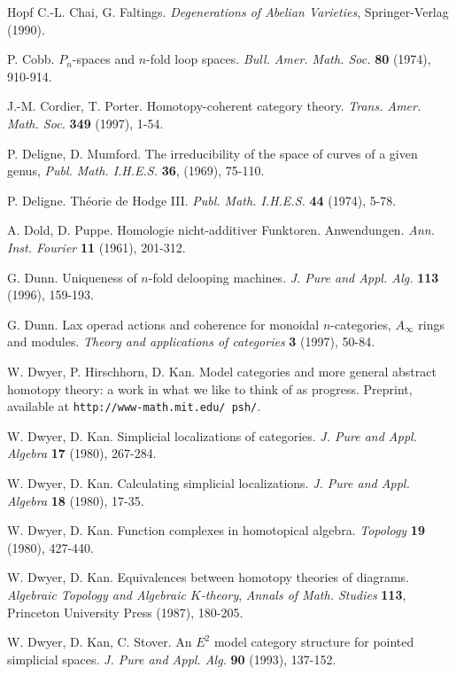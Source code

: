 \begin{thebibliography}{Hopf}
C.-L. Chai, G. Faltings. {\em Degenerations of Abelian Varieties},
Springer-Verlag (1990).

P. Cobb. $P_n$-spaces and $n$-fold loop spaces. {\em Bull. Amer. Math. Soc.}
{\bf 80} (1974), 910-914.

J.-M. Cordier, T. Porter. Homotopy-coherent category theory. {\em Trans. Amer.
Math. Soc.} {\bf 349} (1997), 1-54.

P. Deligne, D. Mumford. The irreducibility of the space of curves of a given
genus, {\em  Publ. Math. I.H.E.S.} {\bf 36}, (1969), 75-110.

P. Deligne. Th\'eorie de Hodge III. {\em  Publ. Math. I.H.E.S.}
{\bf 44} (1974), 5-78.

A. Dold, D. Puppe. Homologie nicht-additiver Funktoren. Anwendungen. {\em
Ann. Inst. Fourier} {\bf
11} (1961), 201-312.

G. Dunn. Uniqueness of $n$-fold delooping machines. {\em J. Pure and Appl. Alg.}
{\bf 113} (1996), 159-193.

G. Dunn. Lax operad actions and coherence for monoidal $n$-categories,
$A_{\infty}$ rings and modules. {\em Theory and applications of categories}
{\bf 3} (1997), 50-84.

W. Dwyer, P. Hirschhorn, D. Kan. Model categories and more general abstract
homotopy theory: a work in what we like to think of as progress. Preprint,
available at {\tt http://www-math.mit.edu/~psh/}.

W. Dwyer, D. Kan. Simplicial localizations of categories. {\em J. Pure and Appl.
Algebra} {\bf 17} (1980), 267-284.

W. Dwyer, D. Kan. Calculating simplicial localizations. {\em J. Pure and
Appl. Algebra} {\bf 18} (1980), 17-35.

W. Dwyer, D. Kan. Function complexes in homotopical algebra. {\em Topology}
{\bf 19} (1980), 427-440.

W. Dwyer, D. Kan. Equivalences between homotopy theories of diagrams.
{\em Algebraic Topology and Algebraic $K$-theory}, {\em Annals of Math. Studies}
{\bf 113}, Princeton University Press (1987), 180-205.

W. Dwyer, D. Kan, C. Stover. An $E^2$ model category structure for pointed
simplicial spaces. {\em J. Pure and Appl. Alg.} {\bf 90} (1993), 137-152.


\end{thebibliography}
